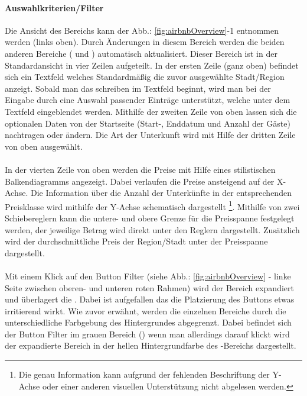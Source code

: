 \documentclass[../Bachelorarbeit.tex]{subfiles}
\begin{document}
\paragraph{Auswahlkriterien/Filter}
\label{airbnb:filter}
Die Ansicht des Bereichs  kann der Abb.: \ref{fig:airbnbOverview}-1 entnommen werden (links oben).
Durch Änderungen in diesem Bereich werden die beiden anderen Bereiche ( und ) automatisch aktualisiert. 
Dieser Bereich ist in der Standardansicht in vier Zeilen aufgeteilt. 
In der ersten Zeile (ganz oben) befindet sich ein Textfeld welches Standardmäßig die zuvor ausgewählte Stadt/Region anzeigt. 
Sobald man das schreiben im Textfeld beginnt, wird man bei der Eingabe durch eine Auswahl passender Einträge unterstützt, welche unter dem Textfeld eingeblendet werden.
Mithilfe der zweiten Zeile von oben lassen sich die optionalen Daten von der Startseite (Start-, Enddatum und Anzahl der Gäste) nachtragen oder ändern.
Die Art der Unterkunft wird mit Hilfe der dritten Zeile von oben ausgewählt.\\
\\
In der vierten Zeile von oben werden die Preise mit Hilfe eines stilistischen Balkendiagramms angezeigt. Dabei verlaufen die Preise ansteigend auf der X-Achse.
Die Information über die Anzahl der Unterkünfte in der entsprechenden Preisklasse wird mithilfe der Y-Achse schematisch dargestellt
\footnote{Die genau Information kann aufgrund der fehlenden Beschriftung der Y-Achse oder einer anderen visuellen Unterstützung nicht abgelesen werden.
	}.
Mithilfe von zwei Schiebereglern kann die untere- und obere Grenze für die Preisspanne festgelegt werden, der jeweilige Betrag wird direkt unter den Reglern dargestellt.
Zusätzlich wird der durchschnittliche Preis der Region/Stadt unter der Preisspanne dargestellt.\\
\\
Mit einem Klick auf den Button Filter (siehe Abb.: \ref{fig:airbnbOverview} - linke Seite zwischen oberen- und unteren roten Rahmen) wird der Bereich  expandiert und überlagert die  .
Dabei ist aufgefallen das die Platzierung des Buttons etwas irritierend wirkt. 
Wie zuvor erwähnt, werden die einzelnen Bereiche durch die unterschiedliche Farbgebung des Hintergrundes abgegrenzt. 
Dabei befindet sich der Button Filter im grauen Bereich () wenn man allerdings darauf klickt wird der expandierte Bereich in der hellen Hintergrundfarbe des -Bereichs dargestellt.
\end{document}
